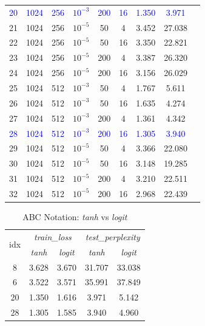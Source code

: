 \documentclass{automatextcc}
\newcommand{\blue}[1]{\textcolor{blue}{#1}}
\begin{document}
\begin{table}[H]
{\begin{tabular}[t]{ccccccccc}
        \blue{20} & \blue{1024} & \blue{256} & \blue{$10^{-3}$} & \blue{200} & \blue{16} & \blue{1.350} & \blue{3.971} \\
        
        21 & 1024 & 256 & $10^{-5}$ & 50 & 4 & 3.452 & 27.038 \\
        22 & 1024 & 256 & $10^{-5}$ & 50 & 16 & 3.350 & 22.821 \\
        23 & 1024 & 256 & $10^{-5}$ & 200 & 4 & 3.387 & 26.320 \\
        24 & 1024 & 256 & $10^{-5}$ & 200 & 16 & 3.156 & 26.029 \\
        25 & 1024 & 512 & $10^{-3}$ & 50 & 4 & 1.767 & 5.611 \\
        26 & 1024 & 512 & $10^{-3}$ & 50 & 16 & 1.635 & 4.274 \\
        27 & 1024 & 512 & $10^{-3}$ & 200 & 4 & 1.361 & 4.342 \\
        
        \blue{28} & \blue{1024} & \blue{512} & \blue{$10^{-3}$} & \blue{200} & \blue{16} & \blue{1.305} & \blue{3.940} \\
        
        29 & 1024 & 512 & $10^{-5}$ & 50 & 4 & 3.366 & 22.080 \\
        30 & 1024 & 512 & $10^{-5}$ & 50 & 16 & 3.148 & 19.285 \\
        31 & 1024 & 512 & $10^{-5}$ & 200 & 4 & 3.210 & 22.511 \\
        32 & 1024 & 512 & $10^{-5}$ & 200 & 16 & 2.968 & 22.439 \\
        \bottomrule
        \end{tabular}
    }
\end{table}

\begin{table}[H]
    \label{tab:abcnotation_tanh_vs_logit}
    \caption{ABC Notation: \textit{tanh} vs \textit{logit}}
    \centering
    \begin{tabular}{c|cc|cc}
        \toprule
        \multirow{2}{*}{idx} &
        \multicolumn{2}{c}{\textit{train\_loss}} &
        \multicolumn{2}{c}{\textit{test\_perplexity}} \\
        & {\textit{tanh}} & {\textit{logit}} & {\textit{tanh}} & {\textit{logit}} \\
        \midrule
        8 & 3.628 & 3.670 & 31.707 & 33.038 \\
        6 & 3.522 & 3.571 & 35.991 & 37.849 \\
        20 & 1.350 & 1.616 & 3.971 & 5.142 \\
        28 & 1.305 & 1.585 & 3.940 & 4.960 \\
    \bottomrule
  \end{tabular}
\end{table}
\end{document}
